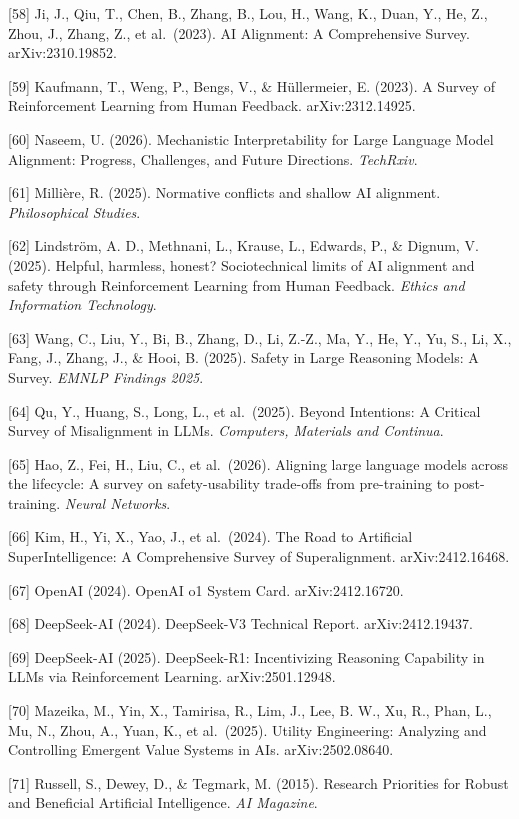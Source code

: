 {[}58{]} Ji, J., Qiu, T., Chen, B., Zhang, B., Lou, H., Wang, K., Duan, Y., He, Z., Zhou, J., Zhang, Z., et al.~(2023). AI Alignment: A Comprehensive Survey. arXiv:2310.19852.

{[}59{]} Kaufmann, T., Weng, P., Bengs, V., \& Hüllermeier, E. (2023). A Survey of Reinforcement Learning from Human Feedback. arXiv:2312.14925.

{[}60{]} Naseem, U. (2026). Mechanistic Interpretability for Large Language Model Alignment: Progress, Challenges, and Future Directions. \emph{TechRxiv}.

{[}61{]} Millière, R. (2025). Normative conflicts and shallow AI alignment. \emph{Philosophical Studies}.

{[}62{]} Lindström, A. D., Methnani, L., Krause, L., Edwards, P., \& Dignum, V. (2025). Helpful, harmless, honest? Sociotechnical limits of AI alignment and safety through Reinforcement Learning from Human Feedback. \emph{Ethics and Information Technology}.

{[}63{]} Wang, C., Liu, Y., Bi, B., Zhang, D., Li, Z.-Z., Ma, Y., He, Y., Yu, S., Li, X., Fang, J., Zhang, J., \& Hooi, B. (2025). Safety in Large Reasoning Models: A Survey. \emph{EMNLP Findings 2025}.

{[}64{]} Qu, Y., Huang, S., Long, L., et al.~(2025). Beyond Intentions: A Critical Survey of Misalignment in LLMs. \emph{Computers, Materials and Continua}.

{[}65{]} Hao, Z., Fei, H., Liu, C., et al.~(2026). Aligning large language models across the lifecycle: A survey on safety-usability trade-offs from pre-training to post-training. \emph{Neural Networks}.

{[}66{]} Kim, H., Yi, X., Yao, J., et al.~(2024). The Road to Artificial SuperIntelligence: A Comprehensive Survey of Superalignment. arXiv:2412.16468.

{[}67{]} OpenAI (2024). OpenAI o1 System Card. arXiv:2412.16720.

{[}68{]} DeepSeek-AI (2024). DeepSeek-V3 Technical Report. arXiv:2412.19437.

{[}69{]} DeepSeek-AI (2025). DeepSeek-R1: Incentivizing Reasoning Capability in LLMs via Reinforcement Learning. arXiv:2501.12948.

{[}70{]} Mazeika, M., Yin, X., Tamirisa, R., Lim, J., Lee, B. W., Xu, R., Phan, L., Mu, N., Zhou, A., Yuan, K., et al.~(2025). Utility Engineering: Analyzing and Controlling Emergent Value Systems in AIs. arXiv:2502.08640.

{[}71{]} Russell, S., Dewey, D., \& Tegmark, M. (2015). Research Priorities for Robust and Beneficial Artificial Intelligence. \emph{AI Magazine}.

